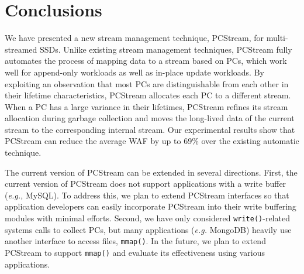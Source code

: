 \section{Conclusions}

We have presented a new stream management technique, \textsf{\small PCStream},
for multi-streamed SSDs.  Unlike existing stream management techniques,
\textsf{\small PCStream} fully automates the process of mapping data to a
stream based on PCs, which work well for append-only workloads as well as
in-place update workloads.  By exploiting an observation that most PCs are
distinguishable from each other in their lifetime characteristics,
\textsf{\small PCStream} allocates each PC to a different stream.  When a PC
has a large variance in their lifetimes, \textsf{\small PCStream} refines its
stream allocation during garbage collection and moves the long-lived data of
the current stream to the corresponding internal stream.  Our experimental
results show that \textsf{\small PCStream} can reduce the average WAF by up to
69\% over the existing automatic technique.

The current version of \textsf{\small PCStream} can be extended in several
directions.  First, the current version of PCStream does not support
applications with a write buffer ({\it e.g.,} MySQL). To address this, we plan
to extend PCStream interfaces so that application developers can easily
incorporate PCStream into their write buffering modules with minimal efforts.
Second, we have only considered \texttt{write()}-related systems calls to
collect PCs, but many applications ({\it e.g.} MongoDB) heavily use another
interface to access files, \texttt{mmap()}. In the future, we plan to extend
PCStream to support \texttt{mmap()} and evaluate its effectiveness using
various applications.
